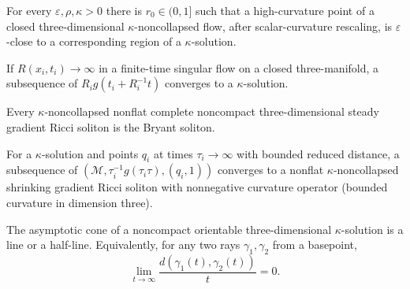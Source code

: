 \begin{theorem}
\label{thm:chow-iv-canonical-neighborhood}

For every \(\varepsilon,\rho,\kappa>0\) there is \(r_0\in(0,1]\) such that a
high-curvature point of a closed three-dimensional \(\kappa\)-noncollapsed
flow, after scalar-curvature rescaling, is \(\varepsilon\)-close to a
corresponding region of a \(\kappa\)-solution.
\end{theorem}

\begin{theorem}
\label{thm:chow-iv-3d-models-all-scales}


If \(R(x_i,t_i)\to\infty\) in a finite-time singular flow on a closed
three-manifold, a subsequence of
\(R_i g(t_i+R_i^{-1}t)\) converges to a \(\kappa\)-solution.
\end{theorem}

\begin{theorem}
\label{thm:chow-iv-bryant-classification}

Every \(\kappa\)-noncollapsed nonflat complete noncompact three-dimensional
steady gradient Ricci soliton is the Bryant soliton.
\end{theorem}

\begin{theorem}
\label{thm:chow-iv-asymptotic-shrinker}

For a \(\kappa\)-solution and points \(q_i\) at times \(\tau_i\to\infty\)
with bounded reduced distance, a subsequence of
\((\mathcal M,\tau_i^{-1}g(\tau_i\tau),(q_i,1))\) converges to a nonflat
\(\kappa\)-noncollapsed shrinking gradient Ricci soliton with nonnegative
curvature operator (bounded curvature in dimension three).
\end{theorem}

\begin{theorem}
\label{thm:chow-iv-3d-asymptotic-cone}


The asymptotic cone of a noncompact orientable three-dimensional
\(\kappa\)-solution is a line or a half-line.  Equivalently, for any two rays
\(\gamma_1,\gamma_2\) from a basepoint,
\[
\lim_{t\to\infty}\frac{d(\gamma_1(t),\gamma_2(t))}{t}=0.
\]
\end{theorem}

